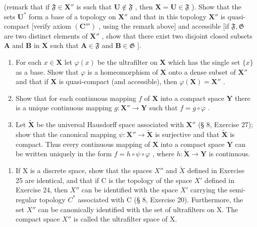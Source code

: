 (remark that if \(\mathfrak{F} \in \mathbf{X}''\) is such that \(\mathbf{U} \notin \mathfrak{F}\) , then \(\mathbf{X} = \mathbf{U} \in \mathfrak{F}\) ). Show that the sets \(\mathbf{U}^*\) form a base of a topology on \(\mathbf{X}''\) and that in this topology \(\mathbf{X}''\) is quasi-compact {[}verify axiom \((\mathbf{C}''')\) , using the remark above{]} and accessible {[}if \(\mathfrak{F}, \mathfrak{G}\) are two distinct elements of \(\mathbf{X}''\) , show that there exist two disjoint closed subsets \(\mathbf{A}\) and \(\mathbf{B}\) in \(\mathbf{X}\) such that \(\mathbf{A} \in \mathfrak{F}\) and \(\mathbf{B} \in \mathfrak{G}\) {]}.

\begin{enumerate}
\def\labelenumi{\alph{enumi})}
\setcounter{enumi}{2}
\item
  For each \(x \in \mathbf{X}\) let \(\varphi(x)\) be the ultrafilter on \(\mathbf{X}\) which has the single set \(\{x\}\) as a base. Show that \(\varphi\) is a homeomorphism of \(\mathbf{X}\) onto a dense subset of \(\mathbf{X}''\) and that if \(\mathbf{X}\) is quasi-compact (and accessible), then \(\varphi(\mathbf{X}) = \mathbf{X}''\) .
\item
  Show that for each continuous mapping \(f\) of \(\mathbf{X}\) into a compact space \(\mathbf{Y}\) there is a unique continuous mapping \(g: \mathbf{X}'' \to \mathbf{Y}\) such that \(f = g \circ \varphi\) .
\item
  Let \(\tilde{\mathbf{X}}\) be the universal Hausdorff space associated with \(\mathbf{X}''\) (§ 8, Exercise 27); show that the canonical mapping \(\psi: \mathbf{X}'' \to \tilde{\mathbf{X}}\) is surjective and that \(\tilde{\mathbf{X}}\) is compact. Thus every continuous mapping of \(\mathbf{X}\) into a compact space \(\mathbf{Y}\) can be written uniquely in the form \(f = h \circ \psi \circ \varphi\) , where \(h: \tilde{\mathbf{X}} \to \mathbf{Y}\) is continuous.
\end{enumerate}

\begin{enumerate}
\def\labelenumi{\arabic{enumi})}
\setcounter{enumi}{25}
\tightlist
\item
  If X is a discrete space, show that the spaces \(X''\) and \(\tilde{X}\) defined in Exercise 25 are identical, and that if C is the topology of the space \(X'\) defined in Exercise 24, then \(X''\) can be identified with the space \(X'\) carrying the semi-regular topology \(C^*\) associated with C (§ 8, Exercise 20). Furthermore, the set \(X''\) can be canonically identified with the set of ultrafilters on X. The compact space \(X''\) is called the ultrafilter space of X.
\end{enumerate}

